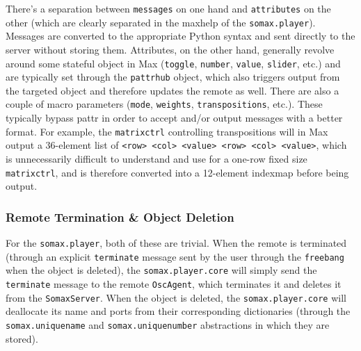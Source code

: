 There's a separation between \texttt{messages} on one hand and \texttt{attributes} on the other (which are clearly separated in the maxhelp of the \texttt{somax.player}). Messages are converted to the appropriate Python syntax and sent directly to the server without storing them. Attributes, on the other hand, generally revolve around some stateful object in Max (\texttt{toggle}, \texttt{number}, \texttt{value}, \texttt{slider}, etc.) and are typically set through the \texttt{pattrhub} object, which also triggers output from the targeted object and therefore updates the remote as well. There are also a couple of macro parameters (\texttt{mode}, \texttt{weights}, \texttt{transpositions}, etc.). These typically bypass pattr in order to accept and/or output messages with a better format. For example, the \texttt{matrixctrl} controlling transpositions will in Max output a 36-element list of \texttt{<row> <col> <value> <row> <col> <value>}, which is unnecessarily difficult to understand and use for a one-row fixed size \texttt{matrixctrl}, and is therefore converted into a 12-element indexmap before being output.


\subsubsection{Remote Termination \& Object Deletion}

For the \texttt{somax.player}, both of these are trivial. When the remote is terminated (through an explicit \texttt{terminate} message sent by the user through the \texttt{freebang} when the object is deleted), the \texttt{somax.player.core} will simply send the \texttt{terminate} message to the remote \texttt{OscAgent}, which terminates it and deletes it from the \texttt{SomaxServer}. When the object is deleted, the \texttt{somax.player.core} will deallocate its name and ports from their corresponding dictionaries (through the \texttt{somax.uniquename} and \texttt{somax.uniquenumber} abstractions in which they are stored).





